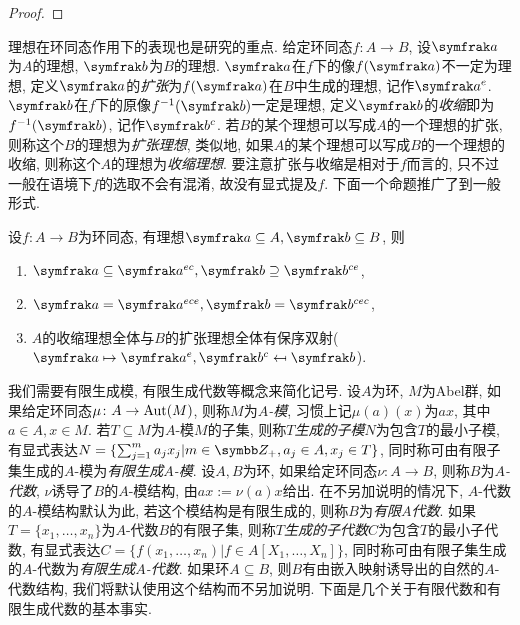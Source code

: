 \begin{proof}
\end{proof}

理想在环同态作用下的表现也是研究的重点. 给定环同态$f\colon A\to B$, 设$\ideal{a}$为$A$的理想, $\ideal{b}$为$B$的理想. $\ideal{a}$在$f$下的像$f(\ideal{a})$不一定为理想, 定义$\ideal{a}$的\emph{扩张}为$f(\ideal{a})$在$B$中生成的理想, 记作$\ideal{a}^e$. $\ideal{b}$在$f$下的原像$f^{-1}(\ideal{b})$一定是理想, 定义$\ideal{b}$的\emph{收缩}即为$f^{-1}(\ideal{b})$, 记作$\ideal{b}^c$. 若$B$的某个理想可以写成$A$的一个理想的扩张, 则称这个$B$的理想为\emph{扩张理想}, 类似地, 如果$A$的某个理想可以写成$B$的一个理想的收缩, 则称这个$A$的理想为\emph{收缩理想}. 要注意扩张与收缩是相对于$f$而言的, 只不过一般在语境下$f$的选取不会有混淆, 故没有显式提及$f$. 下面一个命题推广了到一般形式.

\begin{proposition}\label{prop:extencontr}
    设$f\colon A\to B$为环同态, 有理想$\ideal{a}\subseteq A, \ideal{b}\subseteq B$, 则
    \begin{enumerate}
        \item $\ideal{a}\subseteq\ideal{a}^{ec}, \ideal{b}\supseteq\ideal{b}^{ce}$,
        \item $\ideal{a}=\ideal{a}^{ece}, \ideal{b}=\ideal{b}^{cec}$,
        \item\label{enum:prop-ec-corr} $A$的收缩理想全体与$B$的扩张理想全体有保序双射($\ideal{a}\mapsto\ideal{a}^e, \ideal{b}^c\mapsfrom\ideal{b}$).
    \end{enumerate}
\end{proposition}

我们需要有限生成模, 有限生成代数等概念来简化记号. 设$A$为环, $M$为Abel群, 如果给定环同态$\mu\colon A\to \operatorname{Aut}(M)$, 则称$M$为\emph{$A$-模}, 习惯上记$\mu(a)(x)$为$ax$, 其中$a\in A, x\in M$. 若$T\subseteq M$为$A$-模$M$的子集, 则称\emph{$T$生成的子模}$N$为包含$T$的最小子模, 有显式表达$N=\{\sum_{j=1}^m a_jx_j\vert m\in\ZZ_+, a_j\in A, x_j\in T\}$, 同时称可由有限子集生成的$A$-模为\emph{有限生成$A$-模}. 设$A, B$为环, 如果给定环同态$\nu\colon A\to B$, 则称$B$为\emph{$A$-代数}, $\nu$诱导了$B$的$A$-模结构, 由$ax:=\nu(a)x$给出. 在不另加说明的情况下, $A$-代数的$A$-模结构默认为此, 若这个模结构是有限生成的, 则称$B$为\emph{有限$A$代数}. 如果$T=\{x_1, \dotsc, x_n\}$为$A$-代数$B$的有限子集, 则称\emph{$T$生成的子代数}$C$为包含$T$的最小子代数, 有显式表达$C=\{f(x_1, \dotsc, x_n)\vert f\in A[X_1, \dotsc, X_n]\}$, 同时称可由有限子集生成的$A$-代数为\emph{有限生成$A$-代数}. 如果环$A\subseteq B$, 则$B$有由嵌入映射诱导出的自然的$A$-代数结构, 我们将默认使用这个结构而不另加说明. 下面是几个关于有限代数和有限生成代数的基本事实.


